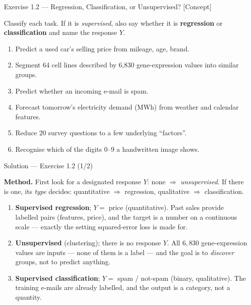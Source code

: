 \documentclass[aspectratio=169,11pt]{beamer}
\begin{document}
\begin{frame}{Exercise 1.2 --- Regression, Classification, or Unsupervised? [Concept]}
\begin{exercise}
Classify each task. If it is \emph{supervised}, also say whether it is
\textbf{regression} or \textbf{classification} and name the response
$Y$.
\begin{enumerate}
  \item Predict a used car's selling price from mileage, age, brand.
  \item Segment 64 cell lines described by 6{,}830 gene-expression
        values into similar groups.
  \item Predict whether an incoming e-mail is spam.
  \item Forecast tomorrow's electricity demand (MWh) from weather and
        calendar features.
  \item Reduce 20 survey questions to a few underlying ``factors''.
  \item Recognise which of the digits 0--9 a handwritten image shows.
\end{enumerate}
\end{exercise}
\end{frame}

\begin{frame}{Solution --- Exercise 1.2 (1/2)}
\begin{solutionbox}
\textbf{Method.} First look for a designated response $Y$: none
$\Rightarrow$ \emph{unsupervised}. If there is one, its \emph{type}
decides: quantitative $\Rightarrow$ regression, qualitative
$\Rightarrow$ classification.
\begin{enumerate}
  \item \textbf{Supervised regression}; $Y=$ price (quantitative).
        Past sales provide labelled pairs (features, price), and the
        target is a number on a continuous scale --- exactly the
        setting squared-error loss is made for.
  \item \textbf{Unsupervised} (clustering); there is no response $Y$.
        All $6{,}830$ gene-expression values are inputs --- none of
        them is a label --- and the goal is to \emph{discover} groups,
        not to predict anything.
  \item \textbf{Supervised classification}; $Y=$ spam / not-spam
        (binary, qualitative). The training e-mails are already
        labelled, and the output is a category, not a quantity.
\end{enumerate}
\end{solutionbox}
\end{frame}
\end{document}
